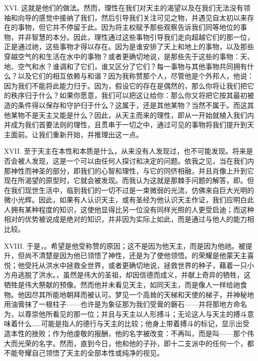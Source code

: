 XVI. 这就是他们的做法。然而，理性在我们对天主的渴望以及在我们无法没有领袖和向导的感觉中接纳了我们，然后引导我们关注可见之物，并遇见自太初以来存在的事物，但它并不停留于此。因为将主权赋予那些观察告诉我们同等地位的事物，并非智慧的本分。因此，理性通过这些事物引导我们走向超越它们的那一位，正是通过祂，这些事物才得以存在。因为是谁安排了天上和地上的事物，以及那些穿越空气的和生活在水中的事物？或者更确切地说，是那些先于这些的事物：天、地、空气和水？谁调和了它们，谁又区分了它们？每一事物与其他事物共同拥有什么？以及它们的相互依赖与和谐？因为我称赞那个人，尽管他是个外邦人，他说：因为我们不能将此能力归于。因为，假设它的存在是偶然的，那么你将让我们把它的秩序归于什么？如果你愿意，我们可以把这让给你：那么你又将把它按其最初被造的条件得以保存和守护归于什么？这属于，还是其他某物？当然不属于。而这其他某物不是天主又能是什么？因此，从天主而来的理性，即从一开始就植入我们内并成为我们首要法则的理性，且贯串于一切之中，通过可见的事物将我们提升到天主面前。让我们重新开始，并推理出这一点。\par

XVII. 至于天主在本性和本质是什么，从来没有人发现过，也不可能发现。将来是否会被人发现，这是一个可以由任何人探讨和决定的问题。依我之见，当在我们内那神性而神圣的部分，即我们的心智和理性，与它的同侪相融，并且肖像上升到它现在所渴望的原型时，它就会被发现。而我认为这就是那棘手问题的解答，即。但在我们现世生活中，临到我们的一切不过是一束微弱的光流，仿佛来自巨大光明的微小光辉。因此，如果有人认识天主，或有圣经为他认识天主作证，我们应明白此人拥有某种程度的知识，这使他显得比另一位没有同样光照的人更受启迪；而这种相对的优势被说成是绝对的知识，并非因为实际上如此，而是通过与他人的能力相比较。\par

XVIII. 于是，。希望是他受称赞的原因；这不是因为他天主，而是因为他祂。被提升，但尚不清楚是因为他已领悟了神性，还是为了使他领悟。的荣耀是他蒙天主喜悦；他受托从洪水中拯救全世界，或者更确切地说，拯救世界的种子，藉着一只小方舟逃脱了洪水。，虽然是伟大的圣祖，却因信德而成义，并献上奇异的牺牲，这牺牲是伟大祭献的预像。然而他并未看见天主，如同天主，而是像人一样给祂食物。他因尽其所能地朝拜而被认可。梦见一个高耸的天梯和天使的梯子，并神秘地用油膏抹了一根柱子——也许是为象征那为我们受膏的磐石——并将那地方命名为，以尊崇他所看见的那一位；并且与天主以人形搏斗；无论这人与天主的搏斗意味着什么……可能是指人的德行与天主的比较；他身上带着搏斗的标记，显示出受造本性的挫败；作为他虔敬的报酬，他的名字被改变：不再叫，而是叫——那个伟大而光荣的名字。然而，直到今日，他和他的子孙，即十二支派中的任何一个，都不能夸耀自己领悟了天主的全部本性或纯净的视见。\par

